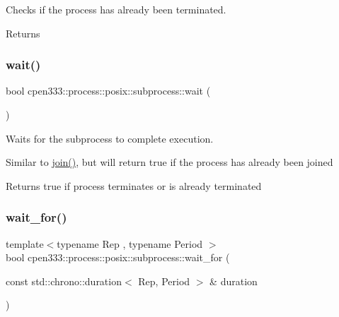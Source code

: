 Checks if the process has already been terminated. 

\begin{DoxyReturn}{Returns}

\end{DoxyReturn}
\mbox{\label{classcpen333_1_1process_1_1posix_1_1subprocess_a8928b9937577c0ec288318b2176156a0}} 
\subsubsection{\texorpdfstring{wait()}{wait()}}
{\footnotesize\ttfamily bool cpen333\+::process\+::posix\+::subprocess\+::wait (\begin{DoxyParamCaption}{ }\end{DoxyParamCaption})\hspace{0.3cm}{\ttfamily [inline]}}



Waits for the subprocess to complete execution. 

Similar to \hyperlink{classcpen333_1_1process_1_1posix_1_1subprocess_af711962e3b6649476bd8cbbd6c59ea8b}{join()}, but will return true if the process has already been joined

\begin{DoxyReturn}{Returns}
true if process terminates or is already terminated 
\end{DoxyReturn}
\mbox{\label{classcpen333_1_1process_1_1posix_1_1subprocess_a1543488d24eaf0f819e81f31d9d388cb}} 
\subsubsection{\texorpdfstring{wait\+\_\+for()}{wait\_for()}}
{\footnotesize\ttfamily template$<$typename Rep , typename Period $>$ \\
bool cpen333\+::process\+::posix\+::subprocess\+::wait\+\_\+for (\begin{DoxyParamCaption}\item[{const std\+::chrono\+::duration$<$ Rep, Period $>$ \&}]{duration }\end{DoxyParamCaption})\hspace{0.3cm}{\ttfamily [inline]}}



